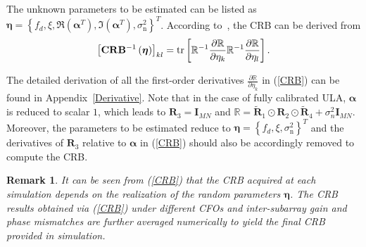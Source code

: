 \documentclass[12pt, draftclsnofoot, onecolumn]{IEEEtran}
\newtheorem{remark}{Remark}
\begin{document}
The unknown parameters to be estimated can be listed as $\boldsymbol{\eta }=\left\{ {{f}_{d}}, \xi, \Re \left( {\boldsymbol{\alpha }}^T \right), \Im \left( {\boldsymbol{\alpha }}^T \right), {{\sigma }_{\mathrm{n}}^{2}} \right\}^T$. According to~\cite{P_Stoica1990TASSP, R_Cao2016TSP}, the CRB can be derived from
\begin{align}{\label{CRB}}
{{\left[ \mathbf{CR}{{\mathbf{B}}^{-1}}\left( \boldsymbol{\eta } \right) \right]}_{kl}}=\operatorname{tr}\left[ {{\mathbb{R}}^{-1}}\frac{\partial \mathbb{R}}{\partial {{\eta }_{k}}}{{\mathbb{R}}^{-1}}\frac{\partial \mathbb{R}}{\partial {{ \eta }_{l}}} \right].
\end{align}

The detailed derivation of all the first-order derivatives $\frac{\partial \mathbb{R}}{\partial {{\eta }_{k}}}$ in (\ref{CRB}) can be found in Appendix~\ref{Derivative}. Note that in the case of fully calibrated ULA, $\boldsymbol{\alpha}$ is reduced to scalar $1$, which leads to $\mathbf{R}_{3} \!=\! \mathbf{I}_{MN}$ and $\mathbb{R} = {{{\mathbf{\tilde{R}}}}_{1}}\odot {{\mathbf{R}}_{2}}\odot {{{\mathbf{\tilde{R}}}}_{4}}+{{\sigma }_{n}^{2}}{{\mathbf{I}}_{MN}}$. Moreover, the parameters to be estimated reduce to $\boldsymbol{\eta } = \left\{ {{f}_{d}}, \xi, {{\sigma }_{\mathrm{n}}^{2}} \right\}^T$ and the derivatives of $\mathbf{R}_{3}$ relative to $\boldsymbol{\alpha}$ in (\ref{CRB}) should also be accordingly removed to compute the CRB.

\begin{remark}
It can be seen from (\ref{CRB}) that the CRB acquired at each simulation depends on the realization of the random parameters $\boldsymbol{\eta }$. The CRB results obtained via (\ref{CRB}) under different CFOs and inter-subarray gain and phase mismatches are further averaged numerically to yield the final CRB provided in simulation.
\end{remark}


\end{document}
